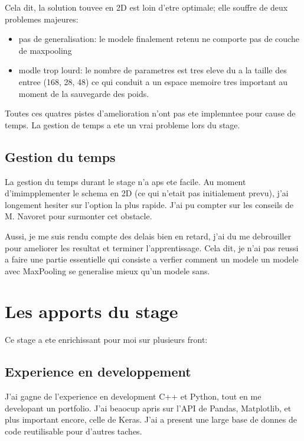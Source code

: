 Cela dit, la solution touvee en 2D est loin d'etre optimale; elle souffre de deux problemes majeures:
\begin{itemize}
 \item pas de generalisation: le modele finalement retenu ne comporte pas de couche de maxpooling
 \item modle trop lourd: le nombre de parametres est tres eleve du a la taille des entree (168, 28, 48) ce qui conduit a un espace memoire tres important au moment de la sauvegarde des poids.
\end{itemize}

Toutes ces quatres pistes d'amelioration n'ont pas ete implemntee pour cause de temps. La gestion de temps a ete un vrai probleme lors du stage.

\subsection{Gestion du temps}
La gestion du temps durant le stage n'a aps ete facile. Au moment d'imimpplementer le schema en 2D (ce qui n'etait pas initialement prevu), j'ai longement hesiter sur l'option la plus rapide. J'ai pu compter sur les conseils de M. Navoret pour surmonter cet obstacle. 

Aussi, je me suis rendu compte des delais bien en retard, j'ai du me debrouiller pour ameliorer les resultat et terminer l'apprentissage. Cela dit, je n'ai pas reussi a faire une partie essentielle qui consiste a verfier comment un modele un modele avec MaxPooling se generalise mieux qu'un modele sans.


\section{Les apports du stage}

Ce stage a ete enrichissant pour moi sur plusieurs front:

\subsection{Experience en developpement}
J'ai gagne de l'experience en development C++ et Python, tout en me developant un portfolio. J'ai beaocup apris sur l'API de Pandas, Matplotlib, et plus important encore, celle de Keras. J'ai a present une large base de donnes de code reutilisable pour d'autres taches.

